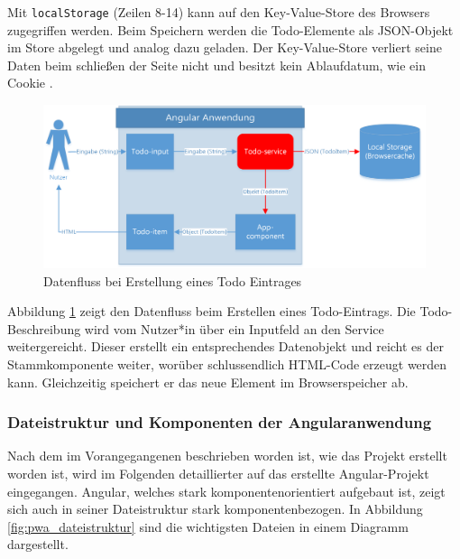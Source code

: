 Mit \texttt{localStorage} (Zeilen 8-14) kann auf den Key-Value-Store des Browsers zugegriffen werden. Beim Speichern werden die Todo-Elemente als JSON-Objekt im Store abgelegt und analog dazu geladen. Der Key-Value-Store verliert seine Daten beim schließen der Seite nicht und besitzt kein Ablaufdatum, wie ein Cookie \cite{LocalStorage}.

\begin{figure}[h]
	\includegraphics[width=\textwidth]{img/pwa_datenfluss_erstellen.png}
	\centering
	\caption{Datenfluss bei Erstellung eines Todo Eintrages}
	\label{fig:pwa_datenfluss_erstellen}
\end{figure}

Abbildung \ref{fig:pwa_datenfluss_erstellen} zeigt den Datenfluss beim Erstellen eines Todo-Eintrags. Die Todo-Beschreibung wird vom Nutzer*in über ein Inputfeld an den Service weitergereicht. Dieser erstellt ein entsprechendes Datenobjekt und reicht es der Stammkomponente weiter, worüber schlussendlich HTML-Code erzeugt werden kann. Gleichzeitig speichert er das neue Element im Browserspeicher ab.

\subsubsection{Dateistruktur und Komponenten der Angularanwendung}
Nach dem im Vorangegangenen beschrieben worden ist, wie das Projekt erstellt worden ist, wird im Folgenden detaillierter auf das erstellte Angular-Projekt eingegangen. Angular, welches stark komponentenorientiert aufgebaut ist, zeigt sich auch in seiner Dateistruktur stark komponentenbezogen. In Abbildung \ref{fig:pwa_dateistruktur} sind die wichtigsten Dateien in einem Diagramm dargestellt.

